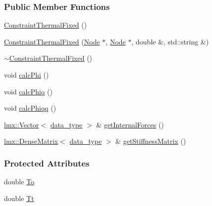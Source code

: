 \subsubsection*{Public Member Functions}
\begin{DoxyCompactItemize}
\item 
\hyperlink{classmknix_1_1_constraint_thermal_fixed_a59d2e73374ce78c68cfb220cc98e0faa}{Constraint\+Thermal\+Fixed} ()
\item 
\hyperlink{classmknix_1_1_constraint_thermal_fixed_ae8a4f39ba80fb72a82c0f27873c9e625}{Constraint\+Thermal\+Fixed} (\hyperlink{classmknix_1_1_node}{Node} $\ast$, \hyperlink{classmknix_1_1_node}{Node} $\ast$, double \&, std\+::string \&)
\item 
\hyperlink{classmknix_1_1_constraint_thermal_fixed_aa98c5ab6b5c193b0a8d267e880692060}{$\sim$\+Constraint\+Thermal\+Fixed} ()
\item 
void \hyperlink{classmknix_1_1_constraint_thermal_fixed_a767fca86d9f4c48683063f2d9ae3c7b5}{calc\+Phi} ()
\item 
void \hyperlink{classmknix_1_1_constraint_thermal_fixed_a9b3edc7f795d17028c47da9fae67f0bc}{calc\+Phiq} ()
\item 
void \hyperlink{classmknix_1_1_constraint_thermal_fixed_ad370eecad0a7034c692723f7cc854c98}{calc\+Phiqq} ()
\item 
\hyperlink{classlmx_1_1_vector}{lmx\+::\+Vector}$<$ \hyperlink{namespacemknix_a16be4b246fbf2cceb141e3a179111020}{data\+\_\+type} $>$ \& \hyperlink{classmknix_1_1_constraint_thermal_fixed_ae399564fc8d05daba18018f3722f158b}{get\+Internal\+Forces} ()
\item 
\hyperlink{classlmx_1_1_dense_matrix}{lmx\+::\+Dense\+Matrix}$<$ \hyperlink{namespacemknix_a16be4b246fbf2cceb141e3a179111020}{data\+\_\+type} $>$ \& \hyperlink{classmknix_1_1_constraint_thermal_fixed_a04350c0243dc075772c8c47f56ab84b5}{get\+Stiffness\+Matrix} ()
\end{DoxyCompactItemize}
\subsubsection*{Protected Attributes}
\begin{DoxyCompactItemize}
\item 
double \hyperlink{classmknix_1_1_constraint_thermal_fixed_a2eb0481bff8266ae4567ef147809d9cb}{To}
\item 
double \hyperlink{classmknix_1_1_constraint_thermal_fixed_ae3d05b53ab96b8a0cbef4eb89d0da1d1}{Tt}
\end{DoxyCompactItemize}


